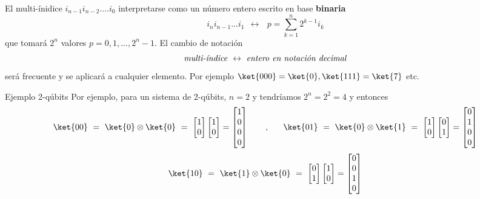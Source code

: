 \documentclass[a4paper,11pt]{book} %
\numberwithin{equation}{chapter}
\begin{document}
El multi-ínidice $i_{n-1}i_{n-2}....i_0$ interpretarse como un número entero escrito en base \textbf{binaria}
	\begin{equation} \label{ec_multiqubit_notacion_binaria}
	\boxed{i_n i_{n-1}...i_1 ~~\longleftrightarrow ~~~p = \sum_{k=1}^n 2^{k-1} i_k}
	\end{equation}
que tomará  $2^n$ valores $p = 0,1,...,2^{n}-1$. El cambio de notación 
\begin{equation}
\text{\textit{multi-índice}} ~ \leftrightarrow ~ \text{\textit{entero en notación decimal}}
\end{equation}
será frecuente y se aplicará a cualquier elemento. Por ejemplo $\ket{000} = \ket{0}, \ket{111} = \ket{7}$ etc.	
	

	\begin{mybox_green}{Ejemplo 2-qúbits}
	Por ejemplo, para un sistema de 2-qúbits,   $n=2$ y tendríamos $2^n=2^2 = 4$ y entonces
	\begin{equation}
\ket{00}~=~ \ket{0}\otimes \ket{0}~=~
\begin{bmatrix}1\\ 0\end{bmatrix}\begin{bmatrix}1\\ 0\end{bmatrix} = \begin{bmatrix}1\\0\\0 \\ 0\end{bmatrix}
~~~~~~,~~~~~
\ket{01}~=~ \ket{0}\otimes \ket{1}~=~
\begin{bmatrix}1\\ 0\end{bmatrix}\begin{bmatrix}0\\ 1\end{bmatrix} = \begin{bmatrix}0\\1\\0 \\ 0\end{bmatrix}
\end{equation}
\begin{equation}
\ket{10}~=~ \ket{1}\otimes \ket{0}~=~
 \begin{bmatrix}0\\ 1\end{bmatrix}\begin{bmatrix}1\\ 0\end{bmatrix} = \begin{bmatrix}0\\0\\1 \\ 0\end{bmatrix}

\end{equation}
\end{mybox_green}
\end{document}

